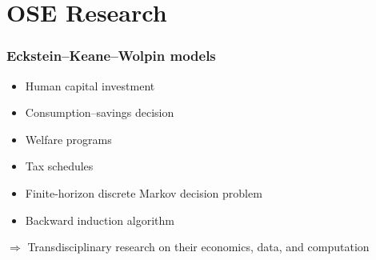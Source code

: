 \section{OSE Research}
\begin{frame}\frametitle{Eckstein--Keane--Wolpin models}

\begin{multicols}{2}

	\vspace{0.3cm}
	\begin{itemize}\setlength\itemsep{1em}
		\item Human capital investment
		\item Consumption--savings decision
	\end{itemize}

    \pause

	\vspace{0.3cm}
	\begin{itemize}\setlength\itemsep{1em}
		\item Welfare programs
		\item Tax schedules
	\end{itemize}

\end{multicols}

 \pause
{}\vspace{0.3cm}
\begin{itemize}\setlength\itemsep{1em}
	\item Finite-horizon discrete Markov decision problem
	\item Backward induction algorithm
\end{itemize}


\pause

\hspace{0.3cm}$\Rightarrow$ Transdisciplinary research on their \alert<4>{economics}, \alert<5>{data}, and \alert<6>{computation}

\end{frame}

